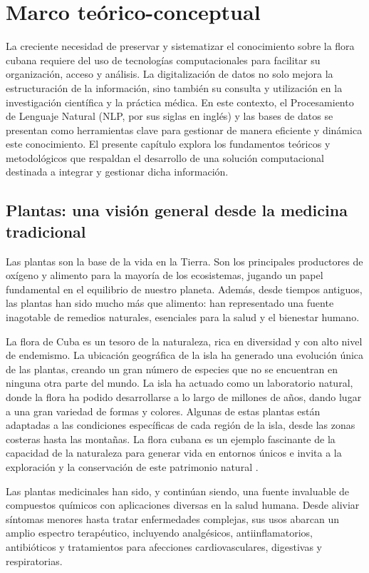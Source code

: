 \chapter{Marco te\'orico-conceptual}

La creciente necesidad de preservar y sistematizar el conocimiento sobre la flora cubana 
requiere  del uso de tecnologías computacionales para facilitar su organización, 
acceso y análisis. La digitalización de datos no solo mejora la estructuración 
de la información, sino también su consulta y utilización en la investigación científica 
y la práctica médica. En este contexto, el Procesamiento de Lenguaje Natural (NLP, por sus siglas en inglés) 
y las bases de datos se presentan como herramientas clave para gestionar de manera eficiente 
y dinámica este conocimiento. El presente capítulo explora los fundamentos teóricos 
y metodológicos que respaldan el desarrollo de una solución computacional destinada a integrar 
y gestionar dicha información.

\section{Plantas: una visión general desde la medicina tradicional}
Las plantas son la base de la vida en la Tierra. Son los principales productores de oxígeno 
y alimento para la mayoría de los ecosistemas, jugando un papel fundamental en el equilibrio 
de nuestro planeta. Además, desde tiempos antiguos, las plantas han sido mucho más que 
alimento: han representado una fuente inagotable de remedios naturales, esenciales para la 
salud y el bienestar humano.

La flora de Cuba es un tesoro de la naturaleza, rica en diversidad y con alto nivel de 
endemismo. La ubicación geográfica de la isla ha generado una evolución única de las plantas, 
creando un gran número de especies que no se encuentran en ninguna otra parte del mundo. 
La isla ha actuado como un laboratorio natural, donde la flora ha podido desarrollarse a lo 
largo de millones de años, dando lugar a una gran variedad de formas y colores. Algunas de 
estas plantas están adaptadas a las condiciones específicas de cada región de la isla, desde 
las zonas costeras hasta las montañas. La flora cubana es un ejemplo fascinante de la 
capacidad de la naturaleza para generar vida en entornos únicos e invita a la exploración y 
la conservación de este patrimonio natural \cite{Pocs1988}.

Las plantas medicinales han sido, y continúan siendo, una fuente invaluable de compuestos 
químicos con aplicaciones diversas en la salud humana. Desde aliviar síntomas menores hasta 
tratar enfermedades complejas, sus usos abarcan un amplio espectro terapéutico, 
incluyendo analgésicos, antiinflamatorios, antibióticos y tratamientos para afecciones 
cardiovasculares, digestivas y respiratorias.

